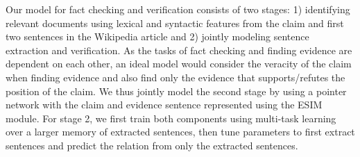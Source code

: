Our model for fact checking and verification consists of two stages: 1) identifying relevant documents using lexical and syntactic features from the claim and first two sentences in the Wikipedia article and 2) jointly modeling sentence extraction and verification.  As the tasks of fact checking and finding evidence are dependent on each other, an ideal model would consider the veracity of the claim when finding evidence and also find only the evidence that supports/refutes the position of the claim.  We thus jointly model the second stage by using a pointer network with the claim and evidence sentence represented using the ESIM module.  For stage 2, we first train both components using multi-task learning over a larger memory of extracted sentences, then tune parameters to first extract sentences and predict the relation from only the extracted sentences.
